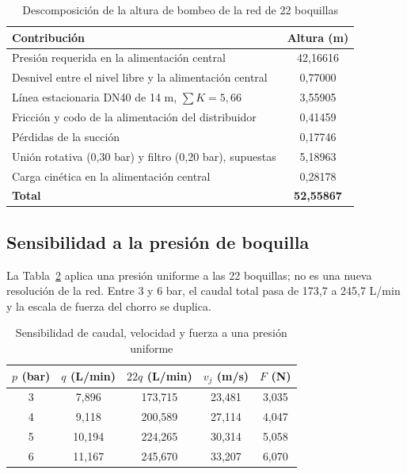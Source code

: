 \begin{table}[htbp]
\centering\small\singlespacing
\caption{Descomposición de la altura de bombeo de la red de 22 boquillas}
\label{tab:red22-altura}
\begin{tabular}{lc}
\toprule
\textbf{Contribución} & \textbf{Altura (m)}\\
\midrule
Presión requerida en la alimentación central & 42,16616\\
Desnivel entre el nivel libre y la alimentación central & 0,77000\\
Línea estacionaria DN40 de 14 m, $\sum K=5{,}66$ & 3,55905\\
Fricción y codo de la alimentación del distribuidor & 0,41459\\
Pérdidas de la succión & 0,17746\\
Unión rotativa (0,30 bar) y filtro (0,20 bar), supuestas & 5,18963\\
Carga cinética en la alimentación central & 0,28178\\
\midrule
\textbf{Total} & \textbf{52,55867}\\
\bottomrule
\end{tabular}
\end{table}

\subsection{Sensibilidad a la presión de boquilla}

La Tabla~\ref{tab:red22-sensibilidad} aplica una presión uniforme a las 22 boquillas; no es una nueva resolución de la red. Entre 3 y 6 bar, el caudal total pasa de 173,7 a 245,7 L/min y la escala de fuerza del chorro se duplica.

\begin{table}[htbp]
\centering\small\singlespacing
\caption{Sensibilidad de caudal, velocidad y fuerza a una presión uniforme}
\label{tab:red22-sensibilidad}
\begin{tabular}{ccccc}
\toprule
\textbf{$p$ (bar)} & \textbf{$q$ (L/min)} & \textbf{$22q$ (L/min)} & \textbf{$v_j$ (m/s)} & \textbf{$F$ (N)}\\
\midrule
3 & 7,896 & 173,715 & 23,481 & 3,035\\
4 & 9,118 & 200,589 & 27,114 & 4,047\\
5 & 10,194 & 224,265 & 30,314 & 5,058\\
6 & 11,167 & 245,670 & 33,207 & 6,070\\
\bottomrule
\end{tabular}
\end{table}

